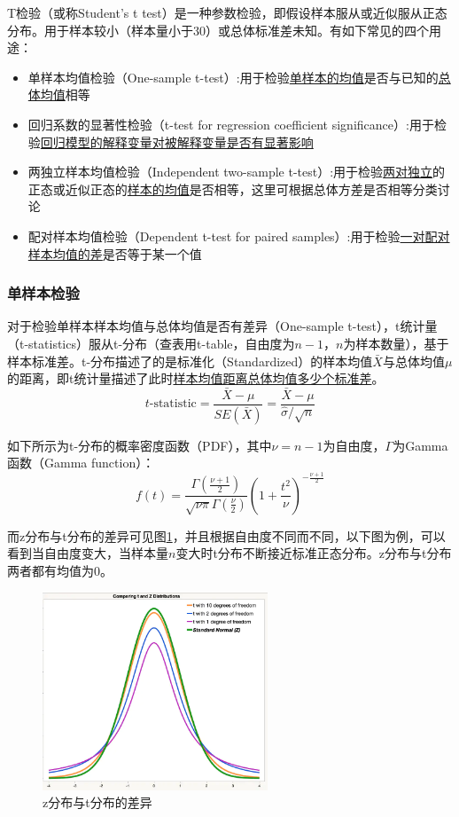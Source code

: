 \documentclass[11pt]{article}
\begin{document}
T检验（或称Student's t test）是一种参数检验，即假设样本服从或近似服从正态分布。用于样本较小（样本量小于30）或总体标准差未知。有如下常见的四个用途：
\begin{itemize}
    \item 单样本均值检验（One-sample t-test）:用于检验\uline{单样本的均值}是否与已知的\uline{总体均值}相等
    \item 回归系数的显著性检验（t-test for regression coefficient significance）:用于检验\uline{回归模型的解释变量对被解释变量是否有显著影响}
    \item 两独立样本均值检验（Independent two-sample t-test）:用于检验\uline{两对独立}的正态或近似正态的\uline{样本的均值}是否相等，这里可根据总体方差是否相等分类讨论
    \item 配对样本均值检验（Dependent t-test for paired samples）:用于检验\uline{一对配对样本均值的差}是否等于某一个值
\end{itemize}

\subsubsection{单样本检验}

对于检验单样本样本均值与总体均值是否有差异（One-sample t-test），t统计量（t-statistics）服从t-分布（查表用t-table，自由度为$n-1$，$n$为样本数量），基于样本标准差。t-分布描述了的是标准化（Standardized）的样本均值$\bar{X}$与总体均值$\mu$的距离，即t统计量描述了此时\uline{样本均值距离总体均值多少个标准差}。
\begin{equation*}
    t\text{-statistic} = \frac{\bar{X}-\mu}{SE(\bar{X})} = \frac{\bar{X}-\mu}{\hat{\sigma}/\sqrt{n}}
\end{equation*}

如下所示为t-分布的概率密度函数（PDF），其中$\nu=n-1$为自由度，$\Gamma$为Gamma函数（Gamma function）：
\begin{equation*}
    f(t) = \frac{\Gamma\left( \frac{\nu+1}{2} \right)}{\sqrt{\nu\pi} \Gamma\left( \frac{\nu}{2} \right)} \left( 1+\frac{t^2}{\nu} \right)^{-\frac{\nu+1}{2}}
\end{equation*}

而z分布与t分布的差异可见图\ref{fig:z-and-t-dist}，并且根据自由度不同而不同，以下图为例，可以看到当自由度变大，当样本量$n$变大时t分布不断接近标准正态分布。z分布与t分布两者都有均值为$0$。
\begin{figure}[ht!]
    \centering
    \includegraphics[width=0.6\textwidth]{fig/z-dist-and-t-dist.png}
    \caption{z分布与t分布的差异}
    \label{fig:z-and-t-dist}
\end{figure}
\end{document}
